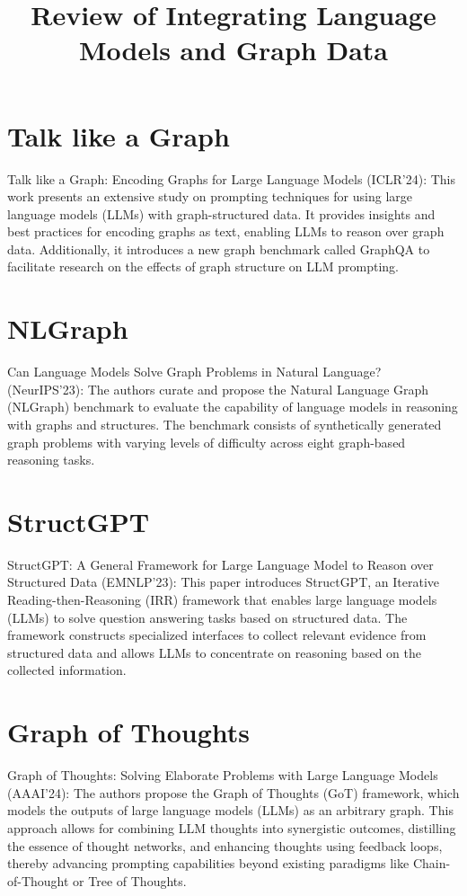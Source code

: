 \documentclass{sigkddExp}
\begin{document}
\title{Review of Integrating Language Models and Graph Data}
\maketitle

\section{Talk like a Graph}
\vspace{3mm}
 Talk like a Graph: Encoding Graphs for Large Language Models (ICLR'24): 
This work presents an extensive study on prompting techniques for using large language models (LLMs) with graph-structured data. It provides insights and best practices for encoding graphs as text, enabling LLMs to reason over graph data. Additionally, it introduces a new graph benchmark called GraphQA to facilitate research on the effects of graph structure on LLM prompting.

\section{NLGraph}
\vspace{3mm}
Can Language Models Solve Graph Problems in Natural Language? (NeurIPS'23): 
The authors curate and propose the Natural Language Graph (NLGraph) benchmark to evaluate the capability of language models in reasoning with graphs and structures. The benchmark consists of synthetically generated graph problems with varying levels of difficulty across eight graph-based reasoning tasks.

\section{StructGPT}
\vspace{3mm}
StructGPT: A General Framework for Large Language Model to Reason over Structured Data (EMNLP'23): 
This paper introduces StructGPT, an Iterative Reading-then-Reasoning (IRR) framework that enables large language models (LLMs) to solve question answering tasks based on structured data. The framework constructs specialized interfaces to collect relevant evidence from structured data and allows LLMs to concentrate on reasoning based on the collected information.

\section{Graph of Thoughts}
\vspace{3mm}
Graph of Thoughts: Solving Elaborate Problems with Large Language Models (AAAI'24): 
The authors propose the Graph of Thoughts (GoT) framework, which models the outputs of large language models (LLMs) as an arbitrary graph. This approach allows for combining LLM thoughts into synergistic outcomes, distilling the essence of thought networks, and enhancing thoughts using feedback loops, thereby advancing prompting capabilities beyond existing paradigms like Chain-of-Thought or Tree of Thoughts.
\end{document}
